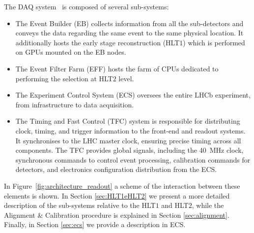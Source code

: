 The DAQ system~\cite{CERN-LHCC-2014-016} is composed of several sub-systems:
\begin{itemize}


\item The Event Builder (EB) collects information from all the sub-detectors and conveys the data regarding the same event to the same physical location. It additionally hosts the early stage reconstruction (HLT$1$) which is performed on GPUs mounted on the EB nodes.

\item The Event Filter Farm (EFF) hosts the farm of CPUs dedicated to performing the selection at HLT$2$ level.

\item The Experiment Control System (ECS) oversees the entire LHCb experiment, from infrastructure to data acquisition.

\item The Timing and Fast Control (TFC) system is responsible for distributing clock, timing, and trigger information to the front-end and readout systems. It synchronises to the LHC master clock, ensuring precise timing across all components. The TFC provides global signals, including the \SI{40}{\mega\hertz} clock, synchronous commands to control event processing, calibration commands for detectors, and electronics configuration distribution from the ECS.
\end{itemize}
In Figure~\ref{fig:architecture_readout} a scheme of the interaction between these elements is shown.
In Section \ref{sec:HLT1eHLT2} we present a more detailed description of the sub-systems relative to the HLT$1$ and HLT$2$, while the Alignment \& Calibration procedure is explained in Section \ref{sec:alignment}. Finally, in Section \ref{sec:ecs} we provide a description in ECS. 

